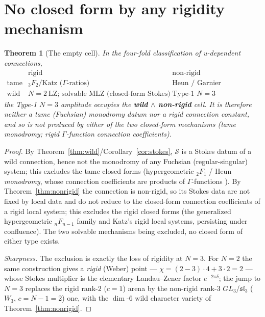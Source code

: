 \documentclass[11pt]{article}
\newtheorem{theorem}{Theorem}
\theoremstyle{definition}
\newcommand{\Scat}{\mathcal{S}}
\begin{document}
\section{No closed form by any rigidity mechanism}\label{sec:noclosed}

\begin{theorem}[The empty cell]\label{thm:noclosed}
In the four-fold classification of u-dependent connections,
\[
\begin{array}{c|cc}
 & \text{rigid} & \text{non-rigid}\\\hline
\text{tame} & {}_3F_2 / \text{Katz (}\Gamma\text{-ratios)} & \text{Heun / Garnier (holonomic)}\\
\text{wild} & N{=}2\ \text{LZ; solvable MLZ (closed-form Stokes)} & \boxed{\text{Type-1 }N{=}3}
\end{array}
\]
the Type-1 $N{=}3$ amplitude occupies the \textbf{wild}$\,\wedge\,$\textbf{non-rigid} cell. It is therefore
neither a tame (Fuchsian) monodromy datum nor a rigid connection constant, and so is not produced by either
of the two closed-form mechanisms (tame monodromy; rigid $\Gamma$-function connection coefficients).
\end{theorem}

\begin{proof}
By Theorem~\ref{thm:wild}/Corollary~\ref{cor:stokes}, $\Scat$ is a Stokes datum of a wild connection, hence
not the monodromy of any Fuchsian (regular-singular) system; this excludes the tame closed forms
(hypergeometric ${}_2F_1$ / Heun \emph{monodromy}, whose connection coefficients are products of
$\Gamma$-functions \cite{Katz}). By Theorem~\ref{thm:nonrigid} the connection is non-rigid, so its Stokes
data are not fixed by local data and do not reduce to the closed-form connection coefficients of a rigid local
system; this excludes the rigid closed forms (the generalized hypergeometric ${}_nF_{n-1}$ family and Katz's
rigid local systems, persisting under confluence). The two solvable mechanisms being excluded, no closed form
of either type exists.

\emph{Sharpness.} The exclusion is exactly the loss of rigidity at $N{=}3$. For $N{=}2$ the same construction
gives a \emph{rigid} (Weber) point --- $\chi=(2-3)\cdot4+3\cdot2=2$ --- whose Stokes multiplier is the
elementary Landau--Zener factor $e^{-2\pi\delta}$; the jump to $N{=}3$ replaces the rigid rank-$2$ ($c{=}1$)
arena by the non-rigid rank-$3$ $GL_3$/$\mathfrak{sl}_3$ ($W_3$, $c{=}N{-}1{=}2$) one, with the
$\dim$-$6$ wild character variety of Theorem~\ref{thm:nonrigid}.
\end{proof}
\end{document}
